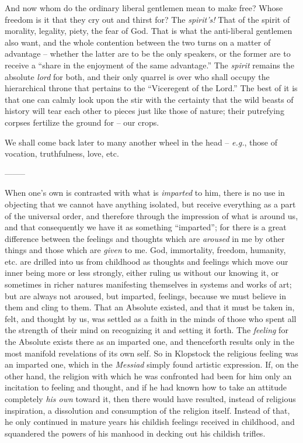 And now whom do the ordinary liberal gentlemen mean to make free? Whose 
freedom is it that they cry out and thirst for? The \textit{spirit's!} That of 
the spirit of morality, legality, piety, the fear of God. That is what the 
anti-liberal gentlemen also want, and the whole contention between the two 
turns on a matter of advantage -- whether the latter are to be the only 
speakers, or the former are to receive a ``share in the enjoyment of the same 
advantage.'' The \textit{spirit} remains the absolute \textit{lord} for both, 
and their only quarrel is over who shall occupy the hierarchical throne that 
pertains to the ``Viceregent of the Lord.'' The best of it is that one can 
calmly look upon the stir with the certainty that the wild beasts of history 
will tear each other to pieces just like those of nature; their putrefying 
corpses fertilize the ground for -- our crops.

We shall come back later to many another wheel in the head -- \textit{e.g.}, 
those of vocation, truthfulness, love, etc.

\begin{center}
--------\end{center}


When one's own is contrasted with what is \textit{imparted} to him, there is 
no use in objecting that we cannot have anything isolated, but receive 
everything as a part of the universal order, and therefore through the 
impression of what is around us, and that consequently we have it as something 
``imparted''; for there is a great difference between the feelings and 
thoughts which are \textit{aroused} in me by other things and those which are 
\textit{given} to me. God, immortality, freedom, humanity, etc. are drilled 
into us from childhood as thoughts and feelings which move our inner being 
more or less strongly, either ruling us without our knowing it, or sometimes 
in richer natures manifesting themselves in systems and works of art; but are 
always not aroused, but imparted, feelings, because we must believe in them 
and cling to them. That an Absolute existed, and that it must be taken in, 
felt, and thought by us, was settled as a faith in the minds of those who 
spent all the strength of their mind on recognizing it and setting it forth. 
The \textit{feeling} for the Absolute exists there as an imparted one, and 
thenceforth results only in the most manifold revelations of its own self. So 
in Klopstock the religious feeling was an imparted one, which in the 
\textit{Messiad} simply found artistic expression. If, on the other hand, the 
religion with which he was confronted had been for him only an incitation to 
feeling and thought, and if he had known how to take an attitude completely 
\textit{his own} toward it, then there would have resulted, instead of 
religious inspiration, a dissolution and consumption of the religion itself. 
Instead of that, he only continued in mature years his childish feelings 
received in childhood, and squandered the powers of his manhood in decking out 
his childish trifles.

